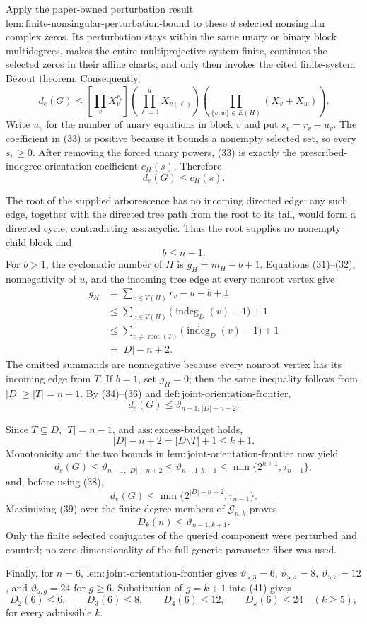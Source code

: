 Apply the paper-owned perturbation result \(\mathrm{lem:finite\mbox{-}nonsingular\mbox{-}perturbation\mbox{-}bound}\) to these \(d\) selected nonsingular complex zeros. Its perturbation stays within the same unary or binary block multidegrees, makes the entire multiprojective system finite, continues the selected zeros in their affine charts, and only then invokes the cited finite-system B\'ezout theorem. Consequently,
\[
 d_e(G)\leq
 [\prod_vX_v^{r_v}]
 \left(\prod_{\ell=1}^{u}X_{v(\ell)}\right)
 \left(\prod_{\{v,w\}\in E(H)}(X_v+X_w)\right).
\tag{33}
\]
Write \(u_v\) for the number of unary equations in block \(v\) and put \(s_v=r_v-u_v\). The coefficient in (33) is positive because it bounds a nonempty selected set, so every \(s_v\geq0\). After removing the forced unary powers, (33) is exactly the prescribed-indegree orientation coefficient \(c_H(s)\). Therefore
\[
 d_e(G)\leq c_H(s).
\tag{34}
\]

The root of the supplied arborescence has no incoming directed edge: any such edge, together with the directed tree path from the root to its tail, would form a directed cycle, contradicting \(\mathrm{ass:acyclic}\). Thus the root supplies no nonempty child block and
\[
 b\leq n-1.
\tag{35}
\]
For \(b>1\), the cyclomatic number of \(H\) is \(g_H=m_H-b+1\). Equations (31)--(32), nonnegativity of \(u\), and the incoming tree edge at every nonroot vertex give
\[
\begin{aligned}
 g_H
 &=\sum_{v\in V(H)}r_v-u-b+1\\
 &\leq\sum_{v\in V(H)}\bigl(\operatorname{indeg}_D(v)-1\bigr)+1\\
 &\leq\sum_{v\ne\operatorname{root}(T)}
       \bigl(\operatorname{indeg}_D(v)-1\bigr)+1\\
 &=|D|-n+2.
\end{aligned}
\tag{36}
\]
The omitted summands are nonnegative because every nonroot vertex has its incoming edge from \(T\). If \(b=1\), set \(g_H=0\); then the same inequality follows from \(|D|\geq|T|=n-1\). By (34)--(36) and \(\mathrm{def:joint\mbox{-}orientation\mbox{-}frontier}\),
\[
 d_e(G)\leq\vartheta_{n-1,\,|D|-n+2}.
\tag{37}
\]

Since \(T\subseteq D\), \(|T|=n-1\), and \(\mathrm{ass:excess\mbox{-}budget}\) holds,
\[
 |D|-n+2=|D\setminus T|+1\leq k+1.
\tag{38}
\]
Monotonicity and the two bounds in \(\mathrm{lem:joint\mbox{-}orientation\mbox{-}frontier}\) now yield
\[
 d_e(G)
 \leq\vartheta_{n-1,\,|D|-n+2}
 \leq\vartheta_{n-1,k+1}
 \leq\min\{2^{k+1},\tau_{n-1}\},
\tag{39}
\]
and, before using (38),
\[
 d_e(G)\leq\min\{2^{|D|-n+2},\tau_{n-1}\}.
\tag{40}
\]
Maximizing (39) over the finite-degree members of \(\mathcal G_{n,k}\) proves
\[
 D_k(n)\leq\vartheta_{n-1,k+1}.
\tag{41}
\]
Only the finite selected conjugates of the queried component were perturbed and counted; no zero-dimensionality of the full generic parameter fiber was used.

Finally, for \(n=6\), \(\mathrm{lem:joint\mbox{-}orientation\mbox{-}frontier}\) gives \(\vartheta_{5,3}=6\), \(\vartheta_{5,4}=8\), \(\vartheta_{5,5}=12\), and \(\vartheta_{5,g}=24\) for \(g\geq6\). Substitution of \(g=k+1\) into (41) gives
\[
 D_2(6)\leq6,\qquad D_3(6)\leq8,\qquad D_4(6)\leq12,
 \qquad D_k(6)\leq24\quad(k\geq5),
\]
for every admissible \(k\).
